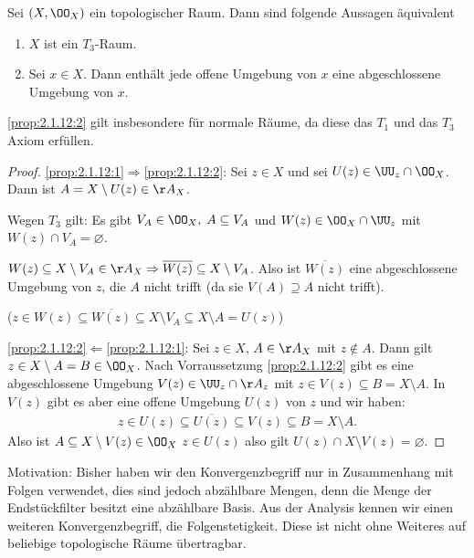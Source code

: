 \begin{prop}
\label{prop:2.1.12}
Sei $(X,\OO_X)$ ein topologischer Raum. Dann sind folgende Aussagen äquivalent
\begin{enumerate}[label=\roman{*})]
  \item\label{prop:2.1.12:1} $X$ ist ein $T_3$-Raum.
  \item\label{prop:2.1.12:2} Sei $x\in X$. Dann enthält jede offene Umgebung von
  $x$ eine abgeschlossene Umgebung von $x$.
\end{enumerate}
\ref{prop:2.1.12:2} gilt insbesondere für normale Räume, da diese das $T_1$
und das $T_3$ Axiom erfüllen.\fishhere
\end{prop}
\begin{proof}
\ref{prop:2.1.12:1}$\Rightarrow$\ref{prop:2.1.12:2}: Sei $z\in X$ und sei
$U(z)\in\UU_z\cap \OO_X$. Dann ist $A=X\setminus U(z) \in \AA_X$.

Wegen $T_3$ gilt: Es gibt $V_A\in\OO_X,\;A\subseteq V_A$ und
$W(z)\in\OO_X\cap\UU_z$ mit $W(z)\cap V_A = \varnothing$.

$W(z)\subseteq X\setminus V_A\in \AA_X\Rightarrow \overline{W(z)} \subseteq
X\setminus V_A$. Also ist $\overline{W(z)}$ eine abgeschlossene Umgebung von
$z$, die $A$ nicht trifft (da sie $V(A)\supseteq A$ nicht trifft).

($z\in W(z)\subseteq\overline{W(z)}\subseteq X\setminus V_A\subseteq X\setminus
A = U(z)$)

\ref{prop:2.1.12:2}$\Leftarrow$\ref{prop:2.1.12:1}: Sei $z\in X$,
$A\in\AA_X$ mit $z\notin A$. Dann gilt $z\in X\setminus A = B\in\OO_X$. Nach
Vorraussetzung \ref{prop:2.1.12:2} gibt es eine abgeschlossene Umgebung
$V(z)\in \UU_z\cap \AA_z$ mit $z\in V(z)\subseteq B = X\setminus A$. In
$V(z)$ gibt es aber eine offene Umgebung $U(z)$ von $z$ und wir haben:
\begin{align*}
z\in U(z)\subseteq \overline{U(z)}\subseteq V(z)\subseteq B = X\setminus A.
\end{align*}
Also ist $A\subseteq X\setminus V(z)\in\OO_X$ $z\in U(z)$ also gilt
$U(z)\cap X\setminus V(z) = \varnothing$.\qedhere
\end{proof}


Motivation: Bisher haben wir den Konvergenzbegriff nur in Zusammenhang mit
Folgen verwendet, dies sind jedoch abzählbare Mengen, denn die Menge der
Endstückfilter besitzt eine abzählbare Basis. Aus der Analysis kennen wir einen
weiteren Konvergenzbegriff, die Folgenstetigkeit. Diese ist nicht ohne Weiteres
auf beliebige topologische Räume übertragbar.

